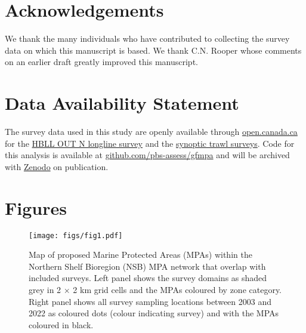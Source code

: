 \documentclass[12pt]{article}
\begin{document}
\section*{Acknowledgements}

We thank the many individuals who have contributed to collecting the survey data on which this manuscript is based.
We thank C.N. Rooper whose comments on an earlier draft greatly improved this manuscript.

\section*{Data Availability Statement}

The survey data used in this study are openly available through \href{open.canada.ca}{open.canada.ca} for the \href{https://open.canada.ca/data/en/dataset/524fde54-1d93-4d22-bb83-df542780a719}{HBLL OUT N longline survey} and the \href{https://open.canada.ca/data/en/dataset/a278d1af-d567-4964-a109-ae1e84cbd24a}{synoptic trawl surveys}.
Code for this analysis is available at \href{https://github.com/pbs-assess/gfmpa}{github.com/pbs-assess/gfmpa} and will be archived with \href{https://zenodo.org/}{Zenodo} on publication.




\clearpage



\section*{Figures}

\begin{figure}[htb]
  \centering
  \texttt{[image: figs/fig1.pdf]}
  \caption{Map of proposed Marine Protected Areas (MPAs) within the Northern Shelf Bioregion (NSB) MPA network that overlap with included surveys. Left panel shows the survey domains as shaded grey in 2 $\times$ 2 km grid cells and the MPAs coloured by zone category. Right panel shows all survey sampling locations between 2003 and 2022 as coloured dots (colour indicating survey) and with the MPAs coloured in black.}
  \label{fig:map}
\end{figure}
\end{document}
